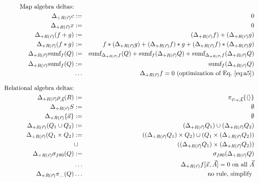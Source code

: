 \begin{figure*}[t!]
\begin{eqnarray}
\nonumber
\mbox{Map algebra deltas:} && \\
\label{eq:a1}
\Delta_{+R(\vec{r})} c       &:=& 0 \\
\label{eq:a2}
\Delta_{+R(\vec{r})} x       &:=& 0 \\
\label{eq:a3}
\Delta_{+R(\vec{r})} (f + g) &:=& (\Delta_{+R(\vec{r})} f) + (\Delta_{+R(\vec{r})} g) \\
\label{eq:a4}
\Delta_{+R(\vec{r})} (f * g) &:=&         f                * (\Delta_{+R(\vec{r})} g)
                              +   (\Delta_{+R(\vec{r})} f) * g                        
                              +   (\Delta_{+R(\vec{r})} f) * (\Delta_{+R(\vec{r})} g)
\\
\label{eq:a5}
\Delta_{+R(\vec{r})} \mbox{sumf}_f(Q) &:=&
   \mbox{sumf}_{\Delta_{+R(\vec{r})} f}(Q)
   + \mbox{sumf}_f(\Delta_{+R(\vec{r})} Q)
   + \mbox{sumf}_{\Delta_{+R(\vec{r})} f}(\Delta_{+R(\vec{r})} Q)
\\
\label{eq:a6}
\Delta_{+R(\vec{r})} \mbox{sumf}_f(Q) &:=&
   \mbox{sumf}_f(\Delta_{+R(\vec{r})} Q)
\\
\nonumber
&\dots& \mbox{$\Delta_{+R(\vec{r})} f = 0$ (optimization of Eq.~\ref{eq:a5})}
\\[2ex]
\nonumber \mbox{Relational algebra deltas:} && \\
\label{eq:b1}
\Delta_{+R(\vec{r})} \rho_{\vec{A}}(R) &:=& \pi_{\vec{r} \rightarrow \vec{A}}\{{\langle\rangle}\}
\\
\label{eq:b2}
\Delta_{+R(\vec{r})} S &:=& \emptyset
\\
\label{eq:b3}
\Delta_{+R(\vec{r})} \{ \vec{a} \} &:=& \emptyset
\\
\label{eq:b4}
\Delta_{+R(\vec{r})} (Q_1 \cup Q_2) &:=&
(\Delta_{+R(\vec{r})} Q_1) \cup (\Delta_{+R(\vec{r})} Q_2)
\\
\label{eq:b5}
\Delta_{+R(\vec{r})} (Q_1 \times Q_2) &:=&
((\Delta_{+R(\vec{r})} Q_1) \times Q_2) \cup
(Q_1 \times (\Delta_{+R(\vec{r})} Q_2)) \\
\nonumber
&\cup&
((\Delta_{+R(\vec{r})} Q_1) \times (\Delta_{+R(\vec{r})} Q_2))
\\
\label{eq:b6}
\Delta_{+R(\vec{r})} \sigma_{f \theta 0}(Q) &:=&
\sigma_{f \theta 0}(\Delta_{+R(\vec{r})} Q)
\\
\nonumber
&\dots& \Delta_{+R(\vec{r})} f[\vec{x}, \vec{A}] = 0 \mbox{ on all $\vec{A}$}
\\
\nonumber
\Delta_{+R(\vec{r})} \pi_{\dots}(Q) &\dots& \mbox{no rule, simplify 
}
\end{eqnarray}
\end{figure*}
